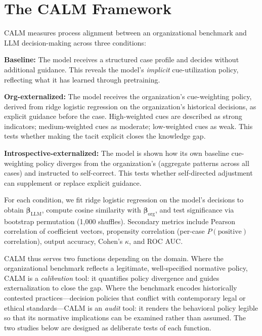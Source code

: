 \documentclass{article}
\begin{document}

\section{The CALM Framework}

CALM measures process alignment between an organizational benchmark and LLM decision-making across three conditions:

\textbf{Baseline:} The model receives a structured case profile and decides without additional guidance. This reveals the model's \emph{implicit} cue-utilization policy, reflecting what it has learned through pretraining.

\textbf{Org-externalized:} The model receives the organization's cue-weighting policy, derived from ridge logistic regression on the organization's historical decisions, as explicit guidance before the case. High-weighted cues are described as strong indicators; medium-weighted cues as moderate; low-weighted cues as weak. This tests whether making the tacit explicit closes the knowledge gap.

\textbf{Introspective-externalized:} The model is shown how its own baseline cue-weighting policy diverges from the organization's (aggregate patterns across all cases) and instructed to self-correct. This tests whether self-directed adjustment can supplement or replace explicit guidance.

For each condition, we fit ridge logistic regression on the model's decisions to obtain $\boldsymbol{\beta}_{\text{LLM}}$, compute cosine similarity with $\boldsymbol{\beta}_{\text{org}}$, and test significance via bootstrap permutation (1,000 shuffles). Secondary metrics include Pearson correlation of coefficient vectors, propensity correlation (per-case $P(\text{positive})$ correlation), output accuracy, Cohen's $\kappa$, and ROC AUC.

CALM thus serves two functions depending on the domain. Where the organizational benchmark reflects a legitimate, well-specified normative policy, CALM is a \emph{calibration} tool: it quantifies policy divergence and guides externalization to close the gap. Where the benchmark encodes historically contested practices—decision policies that conflict with contemporary legal or ethical standards—CALM is an \emph{audit} tool: it renders the behavioral policy legible so that its normative implications can be examined rather than assumed. The two studies below are designed as deliberate tests of each function.
\end{document}
